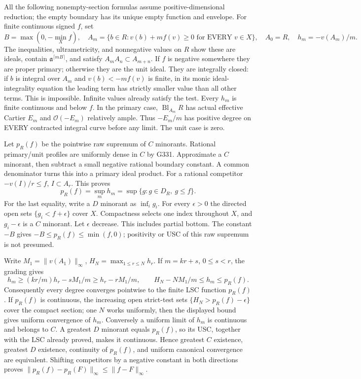 \documentclass[11pt]{article}
\begin{document}
All the following nonempty-section formulas assume positive-dimensional reduction;
the empty boundary has its unique empty function and envelope.
For finite continuous signed $f$, set
\[
 B=\max(0,-\min_X f),\quad
 A_m=\{b\in R:v(b)+mf(v)\ge0\text{ for EVERY }v\in X\},\quad
 A_0=R,\quad h_m=-v(A_m)/m.
\]
The inequalities, ultrametricity, and nonnegative values on $R$ show these
are ideals, contain $\mathfrak a^{\lceil mB\rceil}$, and satisfy
$A_mA_n\subset A_{m+n}$. If $f$ is negative somewhere they are proper
primary; otherwise they are the unit ideal. They are integrally closed:
if $b$ is integral over $A_m$ and $v(b)<-mf(v)$ is finite, in its monic
ideal-integrality equation the leading term has strictly smaller value than
all other terms. This is impossible. Infinite values already satisfy the
test. Every $h_m$ is finite continuous and below $f$. In the primary case,
$\operatorname{Bl}_{A_m}R$ has actual effective Cartier $E_m$ and
$\mathcal O(-E_m)$ relatively ample. Thus $-E_m/m$ has positive degree on
EVERY contracted integral curve before any limit. The unit case is zero.

Let $p_R(f)$ be the pointwise raw supremum of $C$ minorants. Rational
primary/unit profiles are uniformly dense in $C$ by G331. Approximate a
$C$ minorant, then subtract a small negative rational boundary constant.
A common denominator turns this into a primary ideal product. For a
rational competitor $-v(I)/r\le f$, $I\subset A_r$. This proves
\[
 p_R(f)=\sup_m h_m=\sup\{g:g\in D_R,\ g\le f\}.
\]
For the last equality, write a $D$ minorant as $\inf_i g_i$. For every
$\epsilon>0$ the directed open sets $\{g_i<f+\epsilon\}$ cover $X$.
Compactness selects one index throughout $X$, and $g_i-\epsilon$ is a
$C$ minorant. Let $\epsilon$ decrease. This includes partial bottom.
The constant $-B$ gives $-B\le p_R(f)\le\min(f,0)$; positivity or USC
of this raw supremum is not presumed.

Write $M_1=\|v(A_1)\|_\infty$, $H_N=\max_{1\le r\le N}h_r$.
If $m=kr+s$, $0\le s<r$, the grading gives
\[
 h_m\ge (kr/m)h_r-sM_1/m\ge h_r-rM_1/m,
 \qquad H_N-NM_1/m\le h_m\le p_R(f).
\]
Consequently every degree converges pointwise to the finite LSC function
$p_R(f)$. If $p_R(f)$ is continuous, the increasing open strict-test sets
$\{H_N>p_R(f)-\epsilon\}$ cover the compact section; one $N$ works
uniformly, then the displayed bound gives uniform convergence of $h_m$.
Conversely a uniform limit of $h_m$ is continuous and belongs to $C$.
A greatest $D$ minorant equals $p_R(f)$, so its USC, together with the
LSC already proved, makes it continuous. Hence greatest $C$ existence,
greatest $D$ existence, continuity of $p_R(f)$, and uniform canonical
convergence are equivalent. Shifting competitors by a negative constant
in both directions proves $\|p_R(f)-p_R(F)\|_\infty\le\|f-F\|_\infty$.
\end{document}
